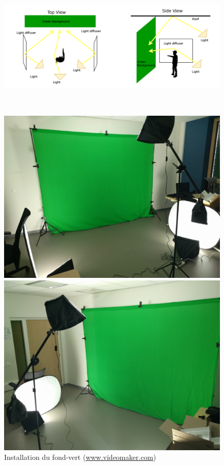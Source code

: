 \begin{figure}[htb]
\centering
   \begin{minipage}[c]{0.95\linewidth}
      \includegraphics[width=0.95\linewidth]{figures/FondVertEN.png}
   \end{minipage} \\
   \vspace{1em}
   \begin{minipage}[c]{0.4\linewidth}
      \includegraphics[width=0.95\linewidth]{figures/img1.jpg}
   \end{minipage}
   \begin{minipage}[c]{0.4\linewidth}
      \includegraphics[width=0.95\linewidth]{figures/img2.jpg}
   \end{minipage}
   \caption{Installation du fond-vert (\url{www.videomaker.com})}
 \label{fig:FondVert}
\end{figure}

